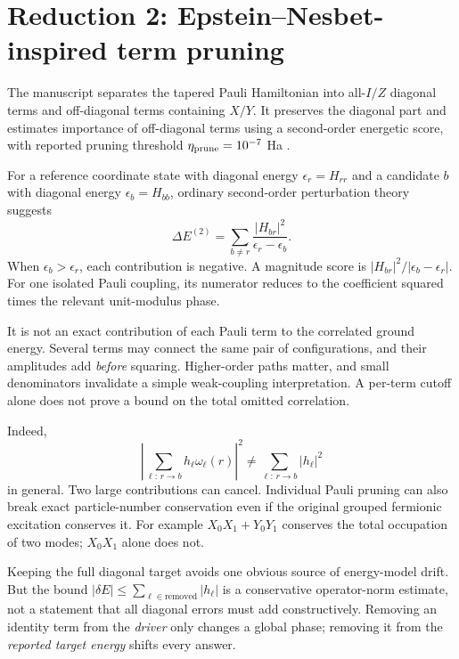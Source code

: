 \documentclass[11pt,a4paper,oneside]{report}
\begin{document}
\section{Reduction 2: Epstein--Nesbet-inspired term pruning}
The manuscript separates the tapered Pauli Hamiltonian into all-$I/Z$ diagonal terms and off-diagonal terms containing $X/Y$. It preserves the diagonal part and estimates importance of off-diagonal terms using a second-order energetic score, with reported pruning threshold $\eta_{\rm prune}=10^{-7}$ Ha \cite{kumar}.

For a reference coordinate state with diagonal energy $\epsilon_r=H_{rr}$ and a candidate $b$ with diagonal energy $\epsilon_b=H_{bb}$, ordinary second-order perturbation theory suggests
\begin{equation}\label{eq:EN}
\Delta E^{(2)}=\sum_{b\ne r}\frac{|H_{br}|^2}{\epsilon_r-\epsilon_b}.
\end{equation}
When $\epsilon_b>\epsilon_r$, each contribution is negative. A magnitude score is $|H_{br}|^2/|\epsilon_b-\epsilon_r|$. For one isolated Pauli coupling, its numerator reduces to the coefficient squared times the relevant unit-modulus phase.

\begin{caution}
It is not an exact contribution of each Pauli term to the correlated ground energy. Several terms may connect the same pair of configurations, and their amplitudes add \emph{before} squaring. Higher-order paths matter, and small denominators invalidate a simple weak-coupling interpretation. A per-term cutoff alone does not prove a bound on the total omitted correlation.
\end{caution}

Indeed,
\begin{equation}
\left|\sum_{\ell:\,r\to b}h_\ell\omega_\ell(r)\right|^2
\ne\sum_{\ell:\,r\to b}|h_\ell|^2
\end{equation}
in general. Two large contributions can cancel. Individual Pauli pruning can also break exact particle-number conservation even if the original grouped fermionic excitation conserves it. For example $X_0X_1+Y_0Y_1$ conserves the total occupation of two modes; $X_0X_1$ alone does not.

Keeping the full diagonal target avoids one obvious source of energy-model drift. But the bound $|\delta E|\le\sum_{\ell\in\mathrm{removed}}|h_\ell|$ is a conservative operator-norm estimate, not a statement that all diagonal errors must add constructively. Removing an identity term from the \emph{driver} only changes a global phase; removing it from the \emph{reported target energy} shifts every answer.
\end{document}
